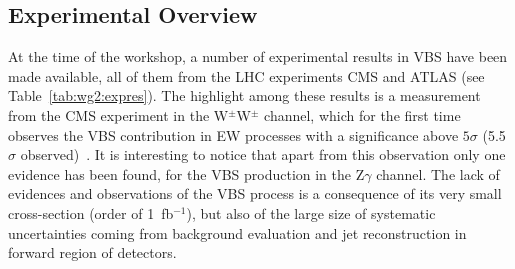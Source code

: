 \label{WG2}

\subsection{Experimental Overview}
 
At the time of the workshop, a number of experimental results in VBS have been made available, all of them from the LHC experiments CMS and ATLAS (see Table~\ref{tab:wg2:expres}). The highlight among these results is a measurement from the CMS experiment in the W$^\pm$W$^\pm$ channel,  which for the first time observes the VBS contribution in EW processes with a significance above $5\sigma$ (5.5 $\sigma$ observed)~\cite{CMS:2017adb}. It is interesting to notice that apart from this observation only one evidence has been found, for the VBS production in the Z$\gamma$ channel.
The lack of evidences and observations of the VBS process is a consequence of its very small cross-section (order of 1~fb$^{-1}$), but also of the large size of systematic uncertainties coming from background evaluation and jet reconstruction in forward region of detectors. 


